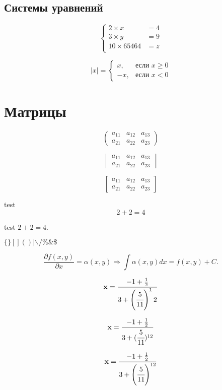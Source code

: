 \documentclass[a4paper,12pt]{article} %
\begin{document}
	\subsection{Системы уравнений}
	
	\[
	\left\{
	\begin{aligned}
		2\times x &= 4  \\
		3\times y &= 9\\
		10 \times 65464 &= z\\
	\end{aligned}
	\right.
	\]
	
	\[
	|x|=\begin{cases}
		x, &\text{если }  x \ge 0 \\
		-x, &\text{если } x<0
	\end{cases}
	\]
	
	\section{Матрицы}
	
	\[
	\begin{pmatrix}
		a_{11} & a_{12} & a_{13} \\
		a_{21} & a_{22} & a_{23}
	\end{pmatrix}
	\]
	
	\[
	\begin{vmatrix}
		a_{11} & a_{12} & a_{13} \\
		a_{21} & a_{22} & a_{23}
	\end{vmatrix}
	\]
	
	\[
	\begin{bmatrix}
		a_{11} & a_{12} & a_{13} \\
		a_{21} & a_{22} & a_{23}
	\end{bmatrix}
	\]
	
	test \begin{equation}
		2+2=4
	\end{equation}

test $2+2=4$.
	
	$ \{\} [] () | \backslash / \% \& \$ $ 
	
	\[\frac{\partial f (x ,y)}{\partial x} = \alpha (x,y)
	\Rightarrow \int \alpha( x,y) dx = f(x, y) + C.\]
	
	\[\mathbf{x}=\frac{-1+\frac{1}{2}}
	{3+\left(\cfrac{5}{11}\right)^12}\]
	
	\[\mathbf x=\frac{-1+\frac12}
	{3+(\cfrac{5}{11})^{12}}\]
	
	\[\mathbf x=\frac{-1+\frac12}
	{3+\left(\cfrac{5}{11}\right)^{12}}\]
	
\end{document}
